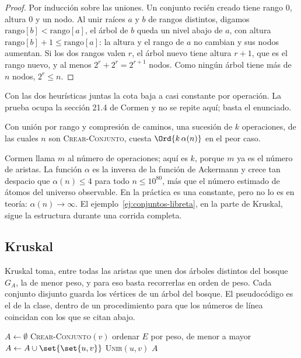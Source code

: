 \documentclass[11pt,letterpaper]{article}
\begin{document}
\begin{proof}
  Por inducción sobre las uniones. Un conjunto recién creado tiene
  rango $0$, altura $0$ y un nodo. Al unir raíces $a$ y $b$ de rangos
  distintos, digamos $\text{rango}[b] < \text{rango}[a]$, el árbol de
  $b$ queda un nivel abajo de $a$, con altura
  $\text{rango}[b] + 1 \le \text{rango}[a]$: la altura y el rango de
  $a$ no cambian y sus nodos aumentan. Si los dos rangos valen $r$, el
  árbol nuevo tiene altura $r + 1$, que es el rango nuevo, y al menos
  $2^r + 2^r = 2^{r+1}$ nodos. Como ningún árbol tiene más de $n$
  nodos, $2^r \le n$.
\end{proof}

Con las dos heurísticas juntas la cota baja a casi constante por
operación. La prueba ocupa la sección 21.4 de Cormen y no se repite
aquí; basta el enunciado.

\begin{teorema}
  \label{teo:cota-conjuntos}
  Con unión por rango y compresión de caminos, una sucesión de $k$
  operaciones, de las cuales $n$ son \textsc{Crear-Conjunto}, cuesta
  $\Ord{k\,\alpha(n)}$ en el peor caso.
\end{teorema}

Cormen llama $m$ al número de operaciones; aquí es $k$, porque $m$ ya
es el número de aristas. La función $\alpha$ es la inversa de la
función de Ackermann y crece tan despacio que $\alpha(n) \le 4$ para
todo $n \le 10^{80}$, más que el número estimado de átomos del
universo observable. En la práctica es una constante, pero no lo es
en teoría: $\alpha(n) \to \infty$. El ejemplo~\ref{ej:conjuntos-libreta},
en la parte de Kruskal, sigue la estructura durante una corrida
completa.



\subsection*{Kruskal}

Kruskal toma, entre todas las aristas que unen dos árboles distintos
del bosque $G_A$, la de menor peso, y para eso basta recorrerlas en
orden de peso. Cada conjunto disjunto guarda los vértices de un árbol
del bosque. El pseudocódigo es el de la clase, dentro de un
procedimiento para que los números de línea coincidan con los que se
citan abajo.

\begin{algorithm}[H]
\caption{\textsc{MST-Kruskal}$(G, w)$}
\label{alg:mst-kruskal}
\begin{algorithmic}[1]
  \State $A \gets \emptyset$
    \State \textsc{Crear-Conjunto}$(v)$
  \EndFor
  \State ordenar $E$ por peso, de menor a mayor
      \State $A \gets A \cup \set{\set{u, v}}$
      \State \textsc{Unir}$(u, v)$
    \EndIf
  \EndFor
  \State \Return $A$
\EndProcedure
\end{algorithmic}
\end{algorithm}
\end{document}
